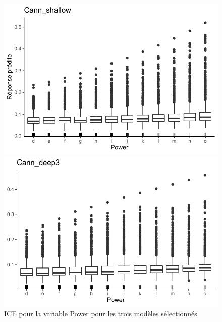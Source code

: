 \begin{figure}[b]
\begin{minipage}{0.45\linewidth}
\end{minipage}
\end{figure}

\begin{figure}[b]
\caption{\label{fig:ice3Power} ICE pour la variable Power pour les trois modèles sélectionnés}
\centering
\begin{minipage}{0.45\linewidth}
\includegraphics[scale=0.6]{Graphiques/icePowerShallow}
\end{minipage}
\hfill
\begin{minipage}{0.45\linewidth}
\includegraphics[scale=0.6]{Graphiques/icePowerCann}
\end{minipage}
\hfill
\begin{minipage}{0.45\linewidth}

\end{minipage}
\end{figure}
